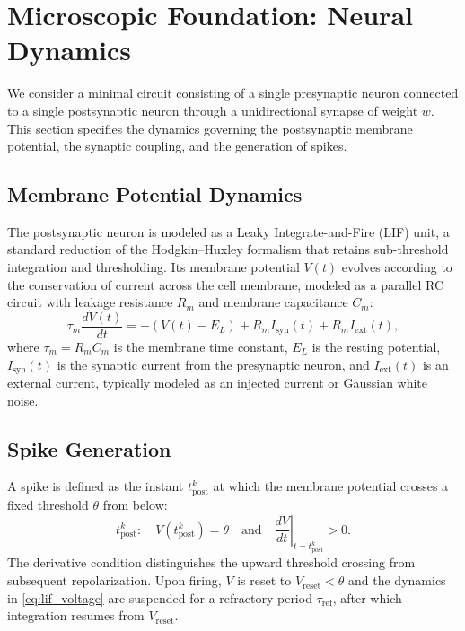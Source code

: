 \documentclass[11pt]{article}
\theoremstyle{definition}
\begin{document}
\section{Microscopic Foundation: Neural Dynamics}

We consider a minimal circuit consisting of a single presynaptic neuron connected to a single postsynaptic neuron through a unidirectional synapse of weight $w$. This section specifies the dynamics governing the postsynaptic membrane potential, the synaptic coupling, and the generation of spikes.

\subsection{Membrane Potential Dynamics}
The postsynaptic neuron is modeled as a Leaky Integrate-and-Fire (LIF) unit, a standard reduction of the Hodgkin--Huxley formalism that retains sub-threshold integration and thresholding.
Its membrane potential $V(t)$ evolves according to the conservation of current across the cell membrane, modeled as a parallel RC circuit with leakage resistance $R_m$ and membrane capacitance $C_m$:
\begin{equation} \label{eq:lif_voltage}
    \tau_m \frac{dV(t)}{dt} = -(V(t) - E_L) + R_m I_{\mathrm{syn}}(t) + R_m I_{\mathrm{ext}}(t),
\end{equation}
where $\tau_m = R_m C_m$ is the membrane time constant, $E_L$ is the resting potential, $I_{\mathrm{syn}}(t)$ is the synaptic current from the presynaptic neuron, and $I_{\mathrm{ext}}(t)$ is an external current, typically modeled as an injected current or Gaussian white noise.

\subsection{Spike Generation} \label{sec:spike_gen}
A spike is defined as the instant $t_{\mathrm{post}}^k$ at which the membrane potential crosses a fixed threshold $\theta$ from below:
\begin{equation} \label{eq:threshold}
    t_{\mathrm{post}}^k : \quad V(t_{\mathrm{post}}^k) = \theta \quad \text{and} \quad \left.\frac{dV}{dt}\right|_{t=t_{\mathrm{post}}^k} > 0.
\end{equation}
The derivative condition distinguishes the upward threshold crossing from subsequent repolarization. Upon firing, $V$ is reset to $V_{\mathrm{reset}} < \theta$ and the dynamics in \eqref{eq:lif_voltage} are suspended for a refractory period $\tau_{\mathrm{ref}}$, after which integration resumes from $V_{\mathrm{reset}}$.
\end{document}
